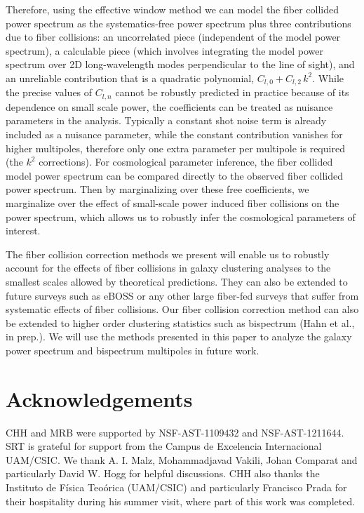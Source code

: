 Therefore, using the effective window method we can model the fiber collided power 
spectrum as the systematics-free  power spectrum plus three contributions due to  
fiber collisions: an uncorrelated piece (independent of the model power spectrum), a calculable piece (which involves integrating the model power spectrum over 2D long-wavelength modes perpendicular to the line of sight), and an unreliable contribution that is a quadratic polynomial, $C_{l,0} + C_{l,2}\, k^2$. 
While the precise values of $C_{l, n}$ cannot be robustly predicted in practice 
because of its dependence on small scale power, the coefficients 
can be treated as nuisance parameters in the analysis. Typically a constant shot 
noise term is already included as a nuisance parameter, while the constant contribution vanishes for higher multipoles, therefore only one extra parameter 
per multipole is required (the $k^2$ corrections). For cosmological parameter inference, the fiber collided model power spectrum 
can be compared directly to the observed fiber 
collided power spectrum. Then by marginalizing over these free coefficients, we marginalize 
over the effect of small-scale power induced fiber collisions on the power spectrum, which allows us to robustly 
infer the cosmological parameters of interest.

The fiber collision correction methods we present will enable us to robustly 
account for the effects of fiber collisions in galaxy clustering analyses 
to the smallest scales allowed by theoretical predictions. They can also be extended to 
future surveys such as eBOSS  or any other large fiber-fed 
surveys that suffer from systematic effects of fiber collisions. Our fiber
collision correction method can also be extended to higher order clustering 
statistics such as bispectrum (Hahn et al., in prep.). We will use the methods 
presented in this paper to analyze the galaxy power spectrum and bispectrum 
multipoles in future work.

\section*{Acknowledgements}
CHH and MRB were supported by NSF-AST-1109432 and NSF-AST-1211644.
SRT is grateful for support from the Campus de Excelencia Internacional UAM/CSIC.
We thank A. I. Malz, Mohammadjavad Vakili, Johan Comparat and particularly 
David W. Hogg for helpful discussions. CHH also thanks the Instituto 
de F\'{i}sica Teo\'{o}rica (UAM/CSIC) and 
particularly Francisco Prada for their hospitality during his summer 
visit, where part of this work was completed.
